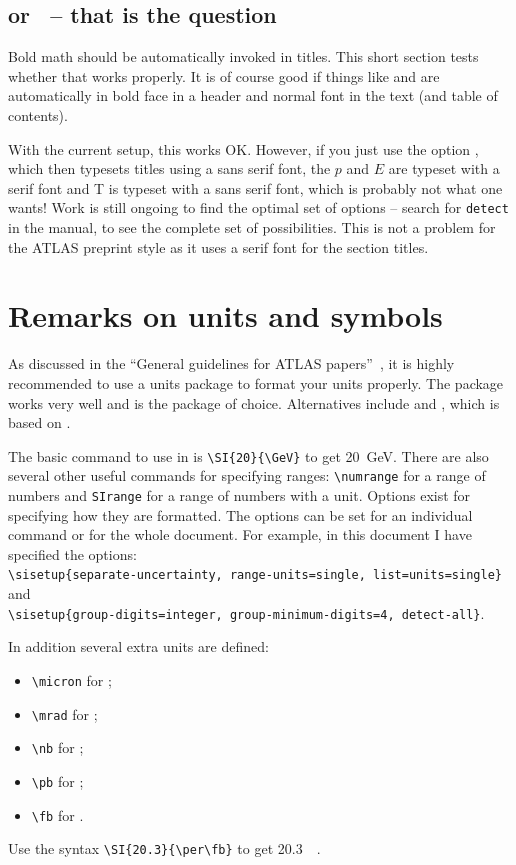 \subsection{\pT or \ET\ -- that is the question}

Bold math should be automatically invoked in titles.
This short section tests whether that works properly.
It is of course good if things like \pT and \ET are automatically in bold face in
a header and normal font in the text (and table of contents).

With the current setup, this works OK. 
However, if you just use the option , which then typesets titles using a sans serif font,
the $p$ and $E$ are typeset with a serif font and \textsf{T} is typeset with a sans serif font,
which is probably not what one wants!
Work is still ongoing to find the optimal set of options
-- search for \texttt{detect} in the  manual, to see the complete set of possibilities.
This is not a problem for the ATLAS preprint style as it uses a serif font for the section titles.


\section{Remarks on units and symbols}

As discussed in the \enquote{General guidelines for ATLAS papers}~\cite{atlas-paper},
it is highly recommended to use a units package to format your units properly.
The package  works very well and is the package of choice.
Alternatives include  and ,
which is based on .

The basic command to use in  is \verb|\SI{20}{\GeV}| to get
\SI{20}{\GeV}. 
There are also several other useful commands for specifying ranges:
\verb|\numrange| for a range of numbers and \verb|SIrange| for a range of numbers with a unit. 
Options exist for specifying how they are formatted.
The options can be set for an individual command or for the whole document.
For example, in this document I have specified the options:\\
\verb|\sisetup{separate-uncertainty, range-units=single, list=units=single}|
and\\
\verb|\sisetup{group-digits=integer, group-minimum-digits=4, detect-all}|.

In addition several extra units are defined:
\begin{itemize}
\item \verb|\micron| for \si{\micron};
\item \verb|\mrad| for \si{\mrad};
\item \verb|\nb| for \si{\nb};
\item \verb|\pb| for \si{\pb};
\item \verb|\fb| for \si{\fb}.
\end{itemize}
Use the syntax \verb|\SI{20.3}{\per\fb}| to get \SI{20.3}{\per\fb}.

